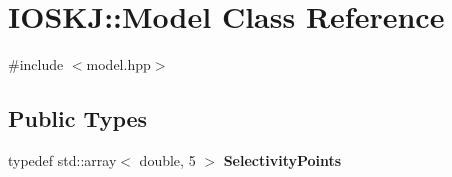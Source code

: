\hypertarget{classIOSKJ_1_1Model}{\section{I\-O\-S\-K\-J\-:\-:Model Class Reference}
\label{classIOSKJ_1_1Model}
}


{\ttfamily \#include $<$model.\-hpp$>$}

\subsection*{Public Types}
\begin{DoxyCompactItemize}
\item 
\hypertarget{classIOSKJ_1_1Model_a925d88350f3dc87464d3893bd9307b91}{typedef std\-::array$<$ double, 5 $>$ {\bfseries Selectivity\-Points}}\label{classIOSKJ_1_1Model_a925d88350f3dc87464d3893bd9307b91}

\end{DoxyCompactItemize}
